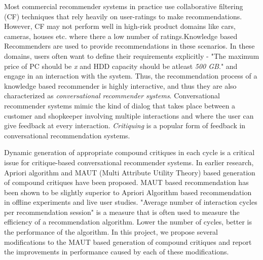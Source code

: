 \abstract
\vspace*{24pt}

Most commercial recommender systems in practice use collaborative filtering (CF) techniques that rely heavily on user-ratings to make recommendations. However, CF may not perform well in high-risk product domains like cars, cameras, houses etc. where there a low number of ratings.Knowledge based Recommenders are used to provide recommendations in these scenarios.
In these domains, users often want to define their requirements explicitly - "The maximum price of PC should be \textit{x} and HDD capacity should be atleast \textit{500 GB}." and engage in an interaction with the system.
Thus, the recommendation process of a knowledge based recommender is highly interactive, and thus they are also characterized as \textit{conversational recommender systems}. 
Conversational recommender systems mimic the kind of dialog that takes place between a customer and shopkeeper involving multiple interactions and where the user can give feedback at every interaction.
\textit{Critiquing} is a popular form of feedback in conversational recommendation systems.

Dynamic generation of appropriate compound critiques in each cycle is a critical issue for critique-based conversational recommender systems.
In earlier research, Apriori algorithm and MAUT (Multi Attribute Utility Theory) based generation of compound critiques have been proposed.
MAUT based recommendation has been shown to be slightly superior to Apriori Algorithm based recommendation in offline experiments and live user studies.
"Average number of interaction cycles per recommendation session" is a measure that is often used to measure the efficiency of a recommendation algorithm. 
Lower the number of cycles, better is the performance of the algorithm. 
In this project, we propose several modifications to the MAUT based generation of compound critiques and report the improvements in performance caused by each of these modifications.






